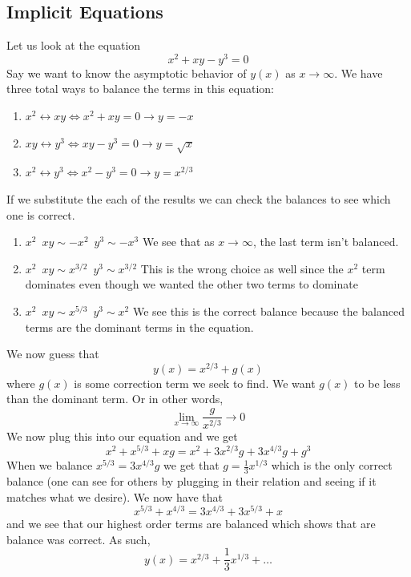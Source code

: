 \documentclass{article}
\begin{document}
\subsection{Implicit Equations}
Let us look at the equation 
\begin{equation*}
    x^2+xy-y^3=0
\end{equation*}
Say we want to know the asymptotic behavior of $y(x)$ as $x\rightarrow \infty$. We have three total ways to balance the terms in this equation:
\begin{enumerate}
    \item $x^2\leftrightarrow xy \Leftrightarrow x^2+xy=0 \rightarrow y=-x$
    \item $xy \leftrightarrow y^3 \Leftrightarrow xy-y^3=0 \rightarrow y=\sqrt{x} $ 
    \item $x^2\leftrightarrow y^3 \Leftrightarrow x^2-y^3=0 \rightarrow y=x^{2/3}$
\end{enumerate}
If we substitute the each of the results we can check the balances to see which one is correct. 
\begin{enumerate}
    \item $x^2 \,\,\,xy\sim-x^2 \,\,\, y^3\sim-x^3$ We see that as $x\rightarrow \infty$, the last term isn't balanced.
    \item $x^2 \,\,\, xy \sim x^{3/2} \,\,\, y^3\sim x^{3/2}$ This is the wrong choice as well since the $x^2$ term dominates even though we wanted the other two terms to dominate
    \item $x^2\,\,\, xy\sim x^{5/3} \,\,\, y^3\sim x^2$ We see this is the correct balance because the balanced terms are the dominant terms in the equation. 
\end{enumerate}
We now guess that 
    \begin{equation*}
        y(x)=x^{2/3} + g(x)
    \end{equation*}
    where $g(x)$ is some correction term we seek to find. We want $g(x)$ to be less than the dominant term. Or in other words, 
    \begin{equation*}
        \lim_{x\rightarrow \infty}\frac{g}{x^{2/3}}\rightarrow 0
    \end{equation*}
    We now plug this into our equation and we get 
    \begin{equation*}
        x^2+x^{5/3}+xg=x^2+3x^{2/3}g+3x^{4/3}g+g^3
    \end{equation*}
    When we balance $x^{5/3}=3x^{4/3}g$ we get that $g=\frac{1}{3}x^{1/3}$ which is the only correct balance (one can see for others by plugging in their relation and seeing if it matches what we desire). We now have that 
    \begin{equation*}
        x^{5/3}+x^{4/3}=3x^{4/3}+3x^{5/3}+x
    \end{equation*}
    and we see that our highest order terms are balanced which shows that are balance was correct. As such,  
    \begin{equation*}
        y(x)= x^{2/3}+\frac{1}{3}x^{1/3}+\ldots
    \end{equation*}
\end{document}
